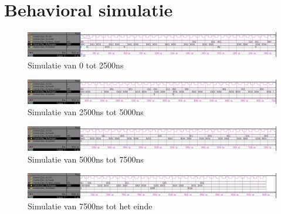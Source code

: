 \section{Behavioral simulatie}
\begin{figure}[ht!]
\includegraphics[width=\textwidth,height=\textheight,keepaspectratio]{Figuren/Controller/wave0-2_5_inv.jpg}
\caption{Simulatie van 0 tot 2500ns}
\label{fig:sim_beh_0-2_5}
\end{figure}
\begin{figure}[ht!]
\includegraphics[width=\textwidth,height=\textheight,keepaspectratio]{Figuren/Controller/wave2_5-5_inv.jpg}
\caption{Simulatie van 2500ns tot 5000ns}
\label{fig:sim_beh_2_5-5}
\end{figure}
\begin{figure}[ht!]
\includegraphics[width=\textwidth,height=\textheight,keepaspectratio]{Figuren/Controller/wave5-7_5_inv.jpg}
\caption{Simulatie van 5000ns tot 7500ns}
\label{fig:sim_beh_5-7_5}
\end{figure}
\begin{figure}[ht!]
\includegraphics[width=\textwidth,height=\textheight,keepaspectratio]{Figuren/Controller/wave7_5-_inv.jpg}
\caption{Simulatie van 7500ns tot het einde}
\label{fig:sim_beh_7_5-}
\end{figure}
\newpage
